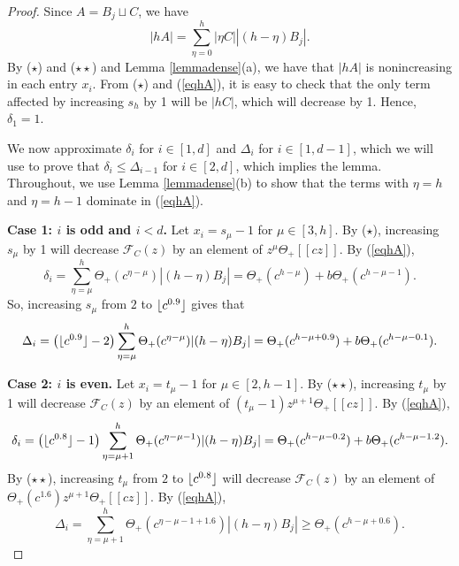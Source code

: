 \documentclass[10pt,a4paper]{article}
\theoremstyle{definition}
\theoremstyle{remark}
\numberwithin{equation}{section}
\numberwithin{theorem}{section}
\newcommand{\calf}{\mathcal{F}}
\DeclarePairedDelimiter{\floor}{\lfloor}{\rfloor}
\begin{document}
\begin{proof}
    Since $A = B_j \sqcup C$, we have \begin{equation}\label{eqhA}|hA| = \sum_{\eta = 0}^h |\eta C||(h-\eta)B_j|.\end{equation} By ($\star$) and ($\star \star$) and Lemma \ref{lemmadense}(a), we have that $|hA|$ is nonincreasing in each entry $x_i$. From ($\star$) and (\ref{eqhA}), it is easy to check that the only term affected by increasing $s_h$ by 1 will be $|hC|$, which will decrease by 1. Hence, $\delta_1 = 1$.
    
    We now approximate $\delta_i$ for $i \in [1,d]$ and $\Delta_{i}$ for $i \in [1,d-1]$, which we will use to prove that $\delta_i \leq \Delta_{i-1}$ for $i \in [2,d]$, which implies the lemma. Throughout, we use Lemma \ref{lemmadense}(b) to show that the terms with $\eta = h$ and $\eta = h-1$ dominate in (\ref{eqhA}). 

    \textbf{Case 1: $i$ is odd and $i < d$.} Let $x_i = s_\mu-1$ for $\mu \in [3,h]$. By ($\star$), increasing $s_\mu$ by 1 will decrease $\calf_C(z)$ by an element of $z^\mu\Theta_+[[cz]]$. By (\ref{eqhA}), \begin{equation}\label{eq501}
        \delta_i = \sum_{\eta = \mu}^h \Theta_+(c^{\eta-\mu})|(h-\eta)B_j| = \Theta_+(c^{h-\mu})+b\Theta_+(c^{h-\mu-1}).
    \end{equation} So, increasing $s_\mu$ from $2$ to $\floor{c^{0.9}}$ gives that \begin{equation}\label{eq502}\Delta_i = \left(\floor{c^{0.9}}-2\right)\sum_{\eta = \mu}^h \Theta_+(c^{\eta-\mu})|(h-\eta)B_j| = \Theta_+(c^{h-\mu+0.9})+b\Theta_+(c^{h-\mu-0.1}).\end{equation}

    \textbf{Case 2: $i$ is even.} Let $x_i = t_\mu-1$ for $\mu \in [2,h-1]$. By ($\star \star$), increasing $t_\mu$ by 1 will decrease $\calf_C(z)$ by an element of $(t_\mu-1)z^{\mu+1}\Theta_+[[cz]]$. By (\ref{eqhA}), \begin{equation}\label{eq503}\delta_{i} = \left(\floor{c^{0.8}}-1\right)\sum_{\eta = \mu+1}^h \Theta_+(c^{\eta-\mu-1})|(h-\eta)B_j| = \Theta_+(c^{h-\mu-0.2})+ b\Theta_+(c^{h-\mu-1.2}).\end{equation} By ($\star \star$), increasing $t_\mu$ from $2$ to $\floor{c^{0.8}}$ will decrease $\calf_C(z)$ by an element of $\Theta_+(c^{1.6})z^{\mu+1}\Theta_+[[cz]]$. By (\ref{eqhA}), \begin{equation}\label{eq504}
        \Delta_{i} = \sum_{\eta = \mu+1}^h \Theta_+(c^{\eta-\mu-1+1.6})|(h-\eta)B_j| \geq \Theta_+(c^{h-\mu+0.6}).
    \end{equation}


\end{proof}
\end{document}
